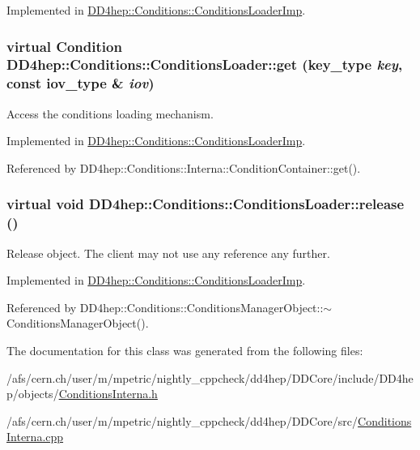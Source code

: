 Implemented in \hyperlink{class_d_d4hep_1_1_conditions_1_1_conditions_loader_imp_a742f7d5a8d3d0666ee64baa3502982ce}{DD4hep::Conditions::ConditionsLoaderImp}.\hypertarget{class_d_d4hep_1_1_conditions_1_1_conditions_loader_a9705bbf09205a5f20a979ae3fe1005bb}{
\subsubsection[{get}]{\setlength{\rightskip}{0pt plus 5cm}virtual {\bf Condition} DD4hep::Conditions::ConditionsLoader::get ({\bf key\_\-type} {\em key}, \/  const {\bf iov\_\-type} \& {\em iov})}}
\label{class_d_d4hep_1_1_conditions_1_1_conditions_loader_a9705bbf09205a5f20a979ae3fe1005bb}


Access the conditions loading mechanism. 

Implemented in \hyperlink{class_d_d4hep_1_1_conditions_1_1_conditions_loader_imp_a0144aac3062bb704dd2c9557bed207da}{DD4hep::Conditions::ConditionsLoaderImp}.

Referenced by DD4hep::Conditions::Interna::ConditionContainer::get().\hypertarget{class_d_d4hep_1_1_conditions_1_1_conditions_loader_a0d1ad39d3ed19e648c673497c6995079}{
\subsubsection[{release}]{\setlength{\rightskip}{0pt plus 5cm}virtual void DD4hep::Conditions::ConditionsLoader::release ()}}
\label{class_d_d4hep_1_1_conditions_1_1_conditions_loader_a0d1ad39d3ed19e648c673497c6995079}


Release object. The client may not use any reference any further. 

Implemented in \hyperlink{class_d_d4hep_1_1_conditions_1_1_conditions_loader_imp_a757ca1fe35b22abe5d4efde0fdc36396}{DD4hep::Conditions::ConditionsLoaderImp}.

Referenced by DD4hep::Conditions::ConditionsManagerObject::$\sim$ConditionsManagerObject().

The documentation for this class was generated from the following files:\begin{DoxyCompactItemize}
\item 
/afs/cern.ch/user/m/mpetric/nightly\_\-cppcheck/dd4hep/DDCore/include/DD4hep/objects/\hyperlink{_d_d_core_2include_2_d_d4hep_2objects_2_conditions_interna_8h}{ConditionsInterna.h}\item 
/afs/cern.ch/user/m/mpetric/nightly\_\-cppcheck/dd4hep/DDCore/src/\hyperlink{_d_d_core_2src_2_conditions_interna_8cpp}{ConditionsInterna.cpp}\end{DoxyCompactItemize}
